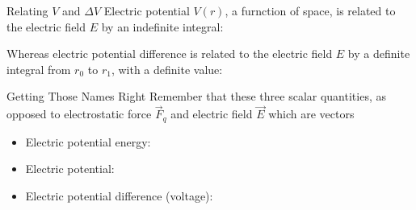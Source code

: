 \documentclass[12pt,aspectratio=169]{beamer}
\begin{document}
\begin{frame}{Relating $V$ and $\Delta V$}
  Electric potential $V(r)$, a furnction of space, is related to the electric
  field $E$ by an {\color{red}indefinite} integral:


  Whereas electric potential difference is related to the electric field $E$
  by a {\color{blue}definite} integral from $r_0$ to $r_1$, with a definite
  value:
  
\end{frame}



\begin{frame}{Getting Those Names Right}
  Remember that these three scalar quantities, as opposed to electrostatic
  force $\vec F_q$ and electric field $\vec E$ which are vectors
  \begin{itemize}
  \item Electric potential energy:
    
  \item Electric potential:

  \item Electric potential difference (voltage):

  \end{itemize}
\end{frame}



\end{document}
